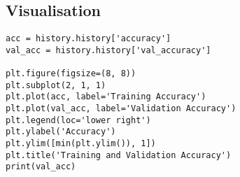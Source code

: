 \documentclass[a4paper, 12pt]{book}
\begin{document}
\begin{appendices}
\section{Visualisation}
\label{appendix:Visualisation}
\begin{lstlisting}
acc = history.history['accuracy']
val_acc = history.history['val_accuracy']

plt.figure(figsize=(8, 8))
plt.subplot(2, 1, 1)
plt.plot(acc, label='Training Accuracy')
plt.plot(val_acc, label='Validation Accuracy')
plt.legend(loc='lower right')
plt.ylabel('Accuracy')
plt.ylim([min(plt.ylim()), 1])
plt.title('Training and Validation Accuracy')
print(val_acc)
\end{lstlisting}

\end{appendices}
\end{document}
